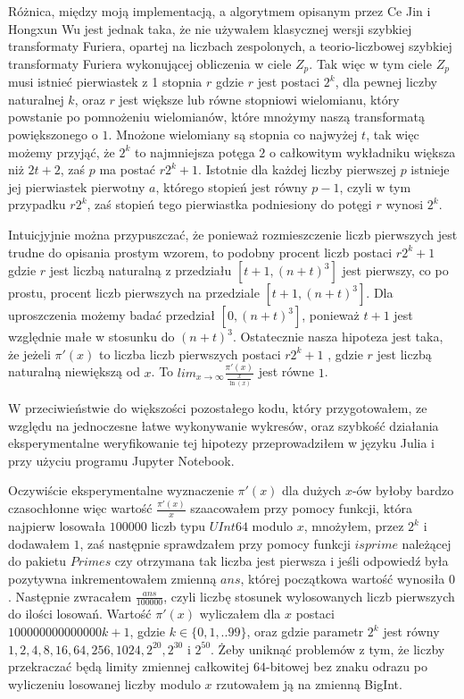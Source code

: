 \documentclass{article}
\begin{document}
Różnica, między moją implementacją, a algorytmem opisanym przez Ce Jin i Hongxun Wu jest 
jednak taka, że nie używałem klasycznej wersji szybkiej transformaty Furiera, opartej na
liczbach zespolonych, a teorio-liczbowej szybkiej transformaty Furiera wykonującej obliczenia
w ciele $Z_p$. Tak więc w tym ciele $Z_p$ musi istnieć pierwiastek z 1 stopnia $r$ gdzie
$r$ jest postaci $2^k$, dla pewnej liczby naturalnej $k$, oraz $r$ jest większe lub równe 
stopniowi wielomianu, który powstanie po pomnożeniu wielomianów, które mnożymy naszą 
transformatą powiększonego o $1$. Mnożone wielomiany są stopnia co najwyżej $t$, tak więc
możemy przyjąć, że $2^k$ to najmniejsza potęga $2$ o całkowitym wykładniku większa niż 
$2t+2$, zaś $p$ ma postać $r2^k+1$. Istotnie dla każdej liczby pierwszej $p$ istnieje jej pierwiastek pierwotny $a$,
którego stopień jest równy $p-1$, czyli w tym przypadku $r2^k$, zaś stopień tego pierwiastka podniesiony
do potęgi $r$ wynosi $2^k$.

Intuicjyjnie można przypuszczać, że ponieważ rozmieszczenie liczb pierwszych jest trudne 
do opisania prostym wzorem, to podobny procent liczb postaci $r2^k+1$ gdzie $r$ jest liczbą
naturalną z przedziału $[t+1,(n+t)^3]$ jest pierwszy, co po prostu, procent liczb 
pierwszych na przedziale $[t+1,(n+t)^3]$. Dla uproszczenia możemy badać przedział $[0,(n+t)^3]$, ponieważ $t+1$ jest względnie małe w stosunku do $(n+t)^3$. 
Ostatecznie nasza hipoteza jest taka, że jeżeli $\pi'(x)$ to liczba liczb pierwszych postaci $r2^k+1$ , gdzie $r$ jest
liczbą naturalną niewiększą od $x$. To $lim_{x \to \infty}\frac{\pi'(x)}{\frac{x}{\ln(x)}}$
jest równe $1$.

W przeciwieństwie do większości pozostałego kodu, który przygotowałem, ze względu na jednoczesne łatwe wykonywanie wykresów, oraz szybkość działania eksperymentalne weryfikowanie
tej hipotezy przeprowadziłem w języku Julia i przy użyciu programu Jupyter Notebook.

Oczywiście eksperymentalne wyznaczenie $\pi'(x)$ dla dużych $x$-ów byłoby bardzo czasochłonne więc wartość $\frac{\pi'(x)}{x}$ szaacowałem przy pomocy funkcji, która najpierw losowała $100000$
liczb typu $UInt64$ modulo $x$, mnożyłem, przez $2^k$ i dodawałem $1$, zaś następnie sprawdzałem przy pomocy funkcji
$isprime$ należącej do pakietu $Primes$ czy otrzymana 
tak liczba jest pierwsza i jeśli odpowiedź była pozytywna inkrementowałem zmienną $ans$, której 
początkowa wartość wynosiła $0$. Następnie zwracałem  $\frac{ans}{100000}$, czyli liczbę
stosunek wylosowanych liczb pierwszych do ilości losowań. Wartość $\pi'(x)$ wyliczałem dla $x$
postaci $100000000000000k+1$, gdzie $k \in \{0,1,..99\}$, oraz gdzie parametr $2^k$ jest równy
$1,2,4,8,16,64,256,1024,2^{20},2^{30}$ i $2^{50}$. Żeby uniknąć problemów z tym, że liczby
przekraczać będą limity zmiennej całkowitej $64$-bitowej bez znaku odrazu po wyliczeniu losowanej liczby
modulo $x$ rzutowałem ją na zmienną BigInt. 
\end{document}
